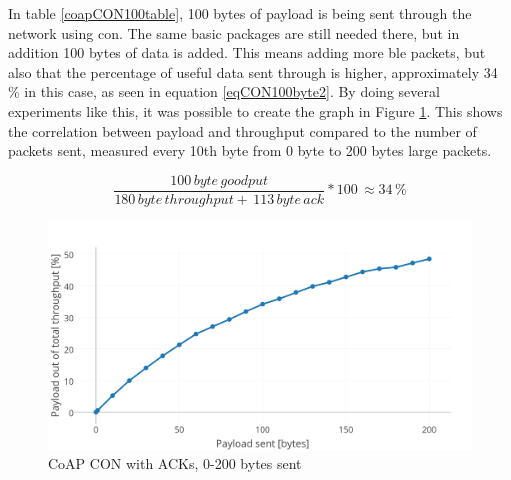 \noindent In table \ref{coapCON100table}, 100 bytes of \gls{payload} is being sent through the network using \gls{con}. The same basic packages are still needed there, but in addition 100 bytes of data is added. This means adding more \gls{ble} packets, but also that the percentage of useful data sent through is  higher, approximately 34 \% in this case, as seen in equation \ref{eqCON100byte2}. By doing several experiments like this, it was possible to create the graph in Figure \ref{fig:coapCON0200}. This shows the correlation between \gls{payload} and \gls{throughput} compared to the number of packets sent, measured every 10th byte from 0 byte to 200 bytes large packets. %

 

\begin{equation} \label{eqCON100byte2}
    \frac{100 \, byte \, goodput}{180 \, byte \, throughput + \, 113 \, byte \, ack}*100 \, \approx 34 \,\%
\end{equation}


\begin{figure}[ht]
    \centering
    \includegraphics[width=1.0\textwidth]{CON0-200withAcks.png}    
    \caption{CoAP CON with ACKs, 0-200 bytes sent}
    \label{fig:coapCON0200}
\end{figure}

